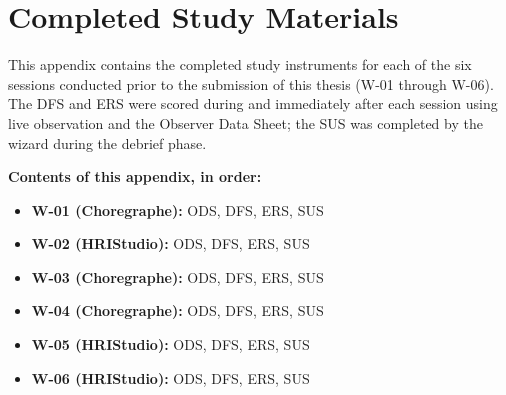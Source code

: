 \chapter{Completed Study Materials}
\label{app:completed_materials}

This appendix contains the completed study instruments for each of the six sessions conducted prior to the submission of this thesis (W-01 through W-06). The DFS and ERS were scored during and immediately after each session using live observation and the Observer Data Sheet; the SUS was completed by the wizard during the debrief phase.

\medskip
\noindent\textbf{Contents of this appendix, in order:}
\begin{itemize}
  \item \textbf{W-01 (Choregraphe):} ODS, DFS, ERS, SUS
  \item \textbf{W-02 (HRIStudio):} ODS, DFS, ERS, SUS
  \item \textbf{W-03 (Choregraphe):} ODS, DFS, ERS, SUS
  \item \textbf{W-04 (Choregraphe):} ODS, DFS, ERS, SUS
  \item \textbf{W-05 (HRIStudio):} ODS, DFS, ERS, SUS
  \item \textbf{W-06 (HRIStudio):} ODS, DFS, ERS, SUS
\end{itemize}





















